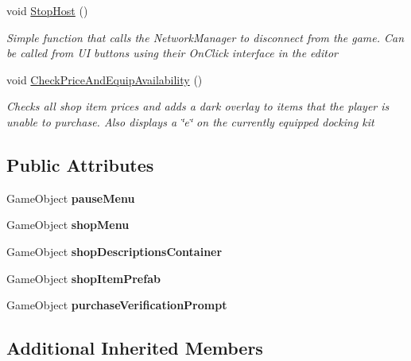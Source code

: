 \begin{DoxyCompactItemize}
void \hyperlink{class_ingame_menu_handler_a887353360c22365c0114e93963cc5062}{Stop\+Host} ()
\begin{DoxyCompactList}\small\item\em Simple function that calls the Network\+Manager to disconnect from the game. Can be called from UI buttons using their On\+Click interface in the editor \end{DoxyCompactList}\item 
void \hyperlink{class_ingame_menu_handler_adc655857f2b8a36bd4271a0a7dc3f0d2}{Check\+Price\+And\+Equip\+Availability} ()
\begin{DoxyCompactList}\small\item\em Checks all shop item prices and adds a dark overlay to items that the player is unable to purchase. Also displays a \char`\"{}e\char`\"{} on the currently equipped docking kit \end{DoxyCompactList}\end{DoxyCompactItemize}
\subsection*{Public Attributes}
\begin{DoxyCompactItemize}
\item 
\hypertarget{class_ingame_menu_handler_a248674f4cb5c5affe7c402ac7e7145bd}{}\label{class_ingame_menu_handler_a248674f4cb5c5affe7c402ac7e7145bd} 
Game\+Object {\bfseries pause\+Menu}
\item 
\hypertarget{class_ingame_menu_handler_a91980b94dd97d3ba3e19e9c39073ba9c}{}\label{class_ingame_menu_handler_a91980b94dd97d3ba3e19e9c39073ba9c} 
Game\+Object {\bfseries shop\+Menu}
\item 
\hypertarget{class_ingame_menu_handler_abc6c180e09310fe5498015ca34bf2dae}{}\label{class_ingame_menu_handler_abc6c180e09310fe5498015ca34bf2dae} 
Game\+Object {\bfseries shop\+Descriptions\+Container}
\item 
\hypertarget{class_ingame_menu_handler_ab3615505ae544b1a71b4e25e4c0fb122}{}\label{class_ingame_menu_handler_ab3615505ae544b1a71b4e25e4c0fb122} 
Game\+Object {\bfseries shop\+Item\+Prefab}
\item 
\hypertarget{class_ingame_menu_handler_a67e85300e5dd73bcaede3c6bea58cf21}{}\label{class_ingame_menu_handler_a67e85300e5dd73bcaede3c6bea58cf21} 
Game\+Object {\bfseries purchase\+Verification\+Prompt}
\end{DoxyCompactItemize}
\subsection*{Additional Inherited Members}


